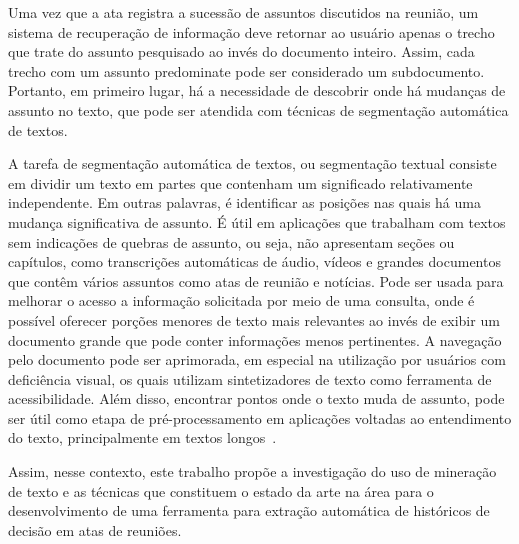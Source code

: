 
Uma vez que a ata registra a sucessão de assuntos discutidos na reunião, um sistema de recuperação de informação deve retornar ao usuário apenas o trecho que trate do assunto pesquisado ao invés do documento inteiro. Assim, cada trecho com um assunto predominate pode ser considerado um subdocumento. Portanto, em primeiro lugar, há a necessidade de descobrir onde há mudanças de assunto no texto, que pode ser atendida com técnicas de segmentação automática de textos. 



A tarefa de segmentação automática de textos, ou segmentação textual consiste em dividir um texto em partes que contenham um significado relativamente independente. Em outras palavras, é identificar as posições nas quais há uma mudança significativa de assunto. É útil em aplicações que trabalham com textos sem indicações de quebras de assunto, ou seja, não apresentam seções ou capítulos, como transcrições automáticas de áudio, vídeos e grandes documentos que contêm vários assuntos como atas de reunião e notícias. Pode ser usada para melhorar o acesso a informação solicitada por meio de uma consulta, onde é possível oferecer porções menores de texto mais relevantes ao invés de exibir um documento grande que pode conter informações menos pertinentes. A navegação pelo documento pode ser aprimorada, em especial na utilização por usuários com deficiência visual, os quais utilizam  sintetizadores de texto como ferramenta de acessibilidade. Além disso, encontrar pontos onde o texto muda de assunto, pode ser útil como etapa de pré-processamento em aplicações voltadas ao entendimento do texto, principalmente em textos longos~\cite{Choi2000}.





Assim, nesse contexto, este trabalho propõe a investigação do uso de mineração de texto e as técnicas que constituem o estado da arte na área para o desenvolvimento de uma ferramenta para extração automática de históricos de decisão em atas de reuniões.






